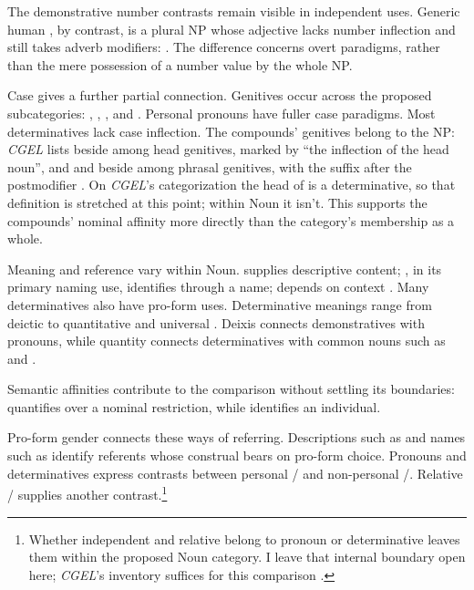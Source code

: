 \documentclass[12pt]{article}
\begin{document}
The demonstrative number contrasts remain visible in independent uses. Generic human , by contrast, is a plural NP whose adjective lacks number inflection and still takes adverb modifiers:  \citep[418]{huddleston2002}. The difference concerns overt paradigms, rather than the mere possession of a number value by the whole NP.

Case gives a further partial connection. Genitives occur across the proposed subcategories: , , , and . Personal pronouns have fuller case paradigms. Most determinatives lack case inflection. The compounds' genitives belong to the NP: \textit{CGEL} lists  beside  among head genitives, marked by \enquote{the inflection of the head noun}, and  and  beside  among phrasal genitives, with the suffix after the postmodifier \citep[479]{huddleston2002}. On \textit{CGEL}'s categorization the head of  is a determinative, so that definition is stretched at this point; within Noun it isn't. This supports the compounds' nominal affinity more directly than the category's membership as a whole.

Meaning and reference vary within Noun.  supplies descriptive content; , in its primary naming use, identifies through a name;  depends on context \citep[425--428, 516--521]{huddleston2002}. Many determinatives also have pro-form uses. Determinative meanings range from deictic  to quantitative  and universal  \citep[358--360, 370--405]{huddleston2002}. Deixis connects demonstratives with pronouns, while quantity connects determinatives with common nouns such as  and .

Semantic affinities contribute to the comparison without settling its boundaries:  quantifies over a nominal restriction, while  identifies an individual.

Pro-form gender \citep{reynolds2025proformgender} connects these ways of referring. Descriptions such as  and names such as  identify referents whose construal bears on pro-form choice. Pronouns and determinatives express contrasts between personal / and non-personal /. Relative / supplies another contrast.\footnote{Whether independent  and relative  belong to pronoun or determinative leaves them within the proposed Noun category. I leave that internal boundary open here; \textit{CGEL}'s inventory suffices for this comparison \citep[397--399]{huddleston2002}.}
\end{document}
